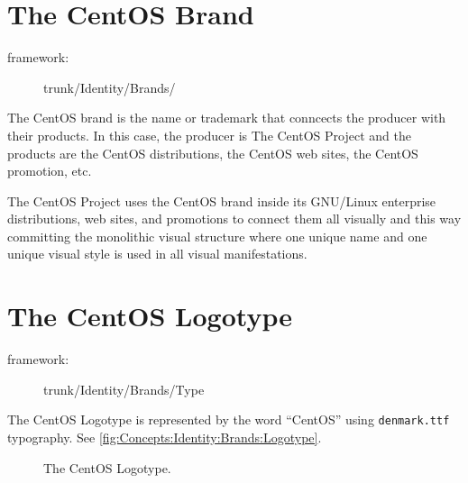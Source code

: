 
\section{The CentOS Brand}
\hypertarget{sec:Concepts:Identity:Brands}{}
\label{sec:Concepts:Identity:Brands}

\begin{description}
\item[framework:] trunk/Identity/Brands/
\end{description}

\noindent The CentOS brand is the name or trademark that conncects the
producer with their products. In this case, the producer is The CentOS
Project and the products are the CentOS distributions, the CentOS web
sites, the CentOS promotion, etc.

The CentOS Project uses the CentOS brand inside its GNU/Linux
enterprise distributions, web sites, and promotions to connect them
all visually and this way committing the monolithic visual structure
where one unique name and one unique visual style is used in all
visual manifestations.

\section{The CentOS Logotype}
\hypertarget{sec:Concepts:Identity:Brands:Logotype}{}
\label{sec:Concepts:Identity:Brands:Logotype}

\begin{description}
\item[framework:] trunk/Identity/Brands/Type
\end{description}

\noindent The CentOS Logotype is represented by the word ``CentOS''
using \texttt{denmark.ttf} typography. See
\autoref{fig:Concepts:Identity:Brands:Logotype}.

\begin{figure}
\begin{center}
\end{center}
\caption{The CentOS Logotype.%
    \label{fig:Concepts:Identity:Brands:Logotype}}
\end{figure}

